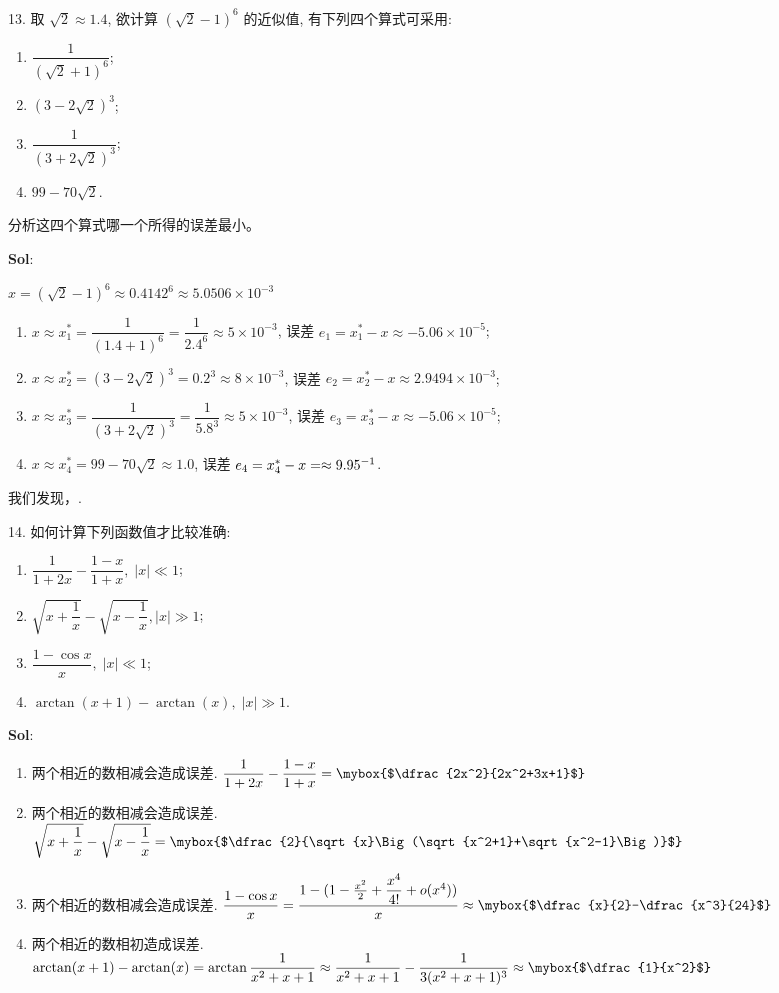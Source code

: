 
13. 取 $\sqrt{2}\approx  1.4$, 欲计算 $(\sqrt{2}-1)^6$ 的近似值, 有下列四个算式可采用:
\begin{enumerate}[(1)]
    \item $\dfrac{1}{(\sqrt{2}+1)^6}$;
    \item $(3-2\sqrt{2})^3$;
    \item $\dfrac{1}{(3+2\sqrt{2})^3}$;
    \item $99-70\sqrt{2}$.
\end{enumerate}
分析这四个算式哪一个所得的误差最小。

\textbf{Sol}:

$x=(\sqrt{2}-1)^6\approx 0.4142^6\approx5.0506\times 10^{-3}$
\begin{enumerate}
    \item $x\approx x_1^*=\dfrac{1}{(1.4+1)^6}=\dfrac{1}{2.4^6}\approx5\times 10^{-3}$, 误差 $e_1=x_1^*-x\approx -5.06\times 10^{-5}$;
    \item $x\approx x_2^*=(3-2\sqrt{2})^3=0.2^3\approx8\times10^{-3}$, 误差 $e_2=x_2^*-x\approx 2.9494\times 10^{-3}$;
    \item $x\approx x_3^*=\dfrac{1}{(3+2\sqrt{2})^3}=\dfrac{1}{5.8^3}\approx 5\times 10^{-3}$, 误差 $e_3=x_3^*-x\approx -5.06\times10^{-5}$;
    \item $x\approx x_4^*=99-70\sqrt{2}\approx 1.0$, 误差 $e_4=x_4^*-x=\approx 9.95\time 10^{-1}$.
\end{enumerate}
我们发现，.

\vspace{12pt}

14. 如何计算下列函数值才比较准确:
\begin{enumerate}
    \item $\dfrac{1}{1+2x}-\dfrac{1-x}{1+x},\;|x|\ll 1$;
    \item $\sqrt{x+\dfrac{1}{x}}-\sqrt{x-\dfrac{1}{x}},|x|\gg 1$;
    \item $\dfrac{1-\cos x}{x},\;|x|\ll 1$;
    \item $\arctan(x+1)-\arctan (x),\;|x|\gg 1$.
\end{enumerate}

\textbf{Sol}:
\begin{enumerate}
    \item 两个相近的数相减会造成误差. $\dfrac{1}{1+2x}-\dfrac{1-x}{1+x}=\mybox{$\dfrac{2x^2}{2x^2+3x+1}$}$
    \item 两个相近的数相减会造成误差. $\sqrt{x+\dfrac{1}{x}}-\sqrt{x-\dfrac{1}{x}}=\mybox{$\dfrac{2}{\sqrt{x}\Big(\sqrt{x^2+1}+\sqrt{x^2-1}\Big)}$}$
    \item 两个相近的数相减会造成误差. $\dfrac{1-\cos x}{x}=\dfrac{1-(1-\frac{x^2}{2}+\dfrac{x^4}{4!}+o(x^4))}{x}\approx\mybox{$\dfrac{x}{2}-\dfrac{x^3}{24}$}$
    \item 两个相近的数相初造成误差. $\arctan(x+1)-\arctan(x)=\arctan\dfrac{1}{x^2+x+1}\approx\dfrac{1}{x^2+x+1}-\dfrac{1}{3(x^2+x+1)^3}\approx\mybox{$\dfrac{1}{x^2}$}$
\end{enumerate}


